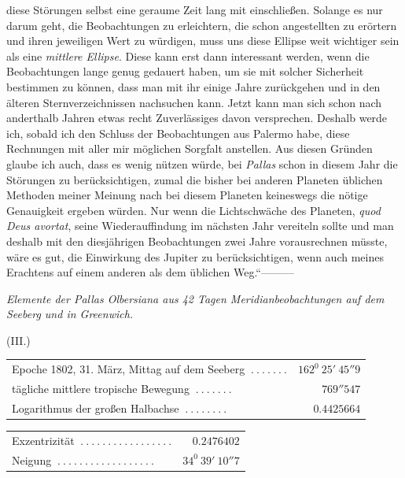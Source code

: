 diese Störungen selbst eine geraume Zeit lang mit einschließen. Solange es nur darum geht, die Beobachtungen zu erleichtern, die schon angestellten zu erörtern und ihren jeweiligen Wert zu würdigen, muss uns diese Ellipse weit wichtiger sein als eine \textit{mittlere Ellipse}. Diese kann erst dann interessant werden, wenn die Beobachtungen lange genug gedauert haben, um sie mit solcher Sicherheit bestimmen zu können, dass man mit ihr einige Jahre zurückgehen und in den älteren Sternverzeichnissen nachsuchen kann. Jetzt kann man sich schon nach anderthalb Jahren etwas recht Zuverlässiges davon versprechen. Deshalb werde ich, sobald ich den Schluss der Beobachtungen aus Palermo
%
habe, diese Rechnungen mit aller mir möglichen Sorgfalt anstellen. Aus diesen Gründen glaube ich auch, dass es wenig nützen würde, bei \textit{Pallas} schon in diesem Jahr die Störungen zu berücksichtigen, zumal die bisher bei anderen Planeten üblichen Methoden meiner Meinung nach bei diesem Planeten keineswegs die nötige Genauigkeit ergeben würden. Nur wenn die Lichtschwäche des Planeten, \textit{quod Deus avortat}, seine Wiederauffindung im nächsten Jahr vereiteln sollte und man deshalb mit den diesjährigen Beobachtungen zwei Jahre vorausrechnen müsste, wäre es gut, die Einwirkung des Jupiter zu berücksichtigen, wenn auch meines Erachtens auf einem anderen als dem üblichen Weg.“\quad —\quad —\quad —

\begin{center}
\textit{Elemente der Pallas Olbersiana aus 42 Tagen Meridianbeobachtungen auf dem Seeberg und in Greenwich.}\par\medskip
(III.)\par\medskip
{\small\setlength{\tabcolsep}{2pt}
\begin{tabular}{l r}
Epoche 1802, 31. März, Mittag auf dem Seeberg $\ .\ .\ .\ .\ .\ .\ .$&$162^0\ 25'\ 45''9$\\
tägliche mittlere tropische Bewegung $\ .\ .\ .\ .\ .\ .\ .$&$769''547$\\
Logarithmus der großen Halbachse $\ .\ .\ .\ .\ .\ .\ .\ .$&$0.4425664$
\end{tabular}
\par\smallskip
{}
\par\smallskip
\begin{tabular}{l r}
Exzentrizität $\ .\ .\ .\ .\ .\ .\ .\ .\ .\ .\ .\ .\ .\ .\ .\ .\ .$&$0.2476402$\\
Neigung $\ .\ .\ .\ .\ .\ .\ .\ .\ .\ .\ .\ .\ .\ .\ .\ .\ .\ .$&$34^0\ 39'\ 10''7$
\end{tabular}}
\end{center}

